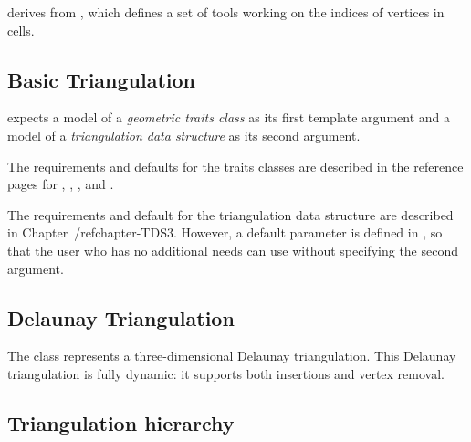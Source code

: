  derives from
, 
which defines a set of tools
working on the indices of vertices in cells. 

\subsection{Basic Triangulation}

 expects a model of a 
\textit{geometric traits class} as its first template argument and a model 
of a \textit{triangulation data structure} as its second argument.

The requirements and defaults for the traits classes are described in
the reference pages for 
,
, 
 , 
and
.

The requirements and default for the triangulation data structure are
described in Chapter~/ref{chapter-TDS3}. However, a default parameter
is defined in , so that the user who 
has no additional needs can use
 without specifying the 
second argument.

\subsection{Delaunay Triangulation} 

The class 
represents a three-dimensional Delaunay triangulation. 
This Delaunay triangulation is fully dynamic: it supports both
insertions and vertex removal. 

\subsection{Triangulation hierarchy} 

